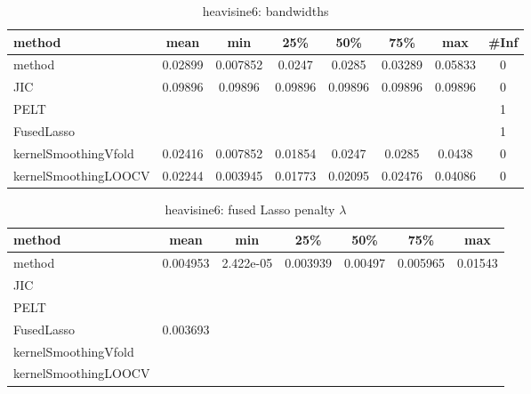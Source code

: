 \begin{table}[ht]
\centering
\begin{tabular}{l|c|ccccc|c}
  \hline
method & mean & min & 25\% & 50\% & 75\% & max & \#Inf \\ 
  \hline
method & 0.02899 & 0.007852 & 0.0247 & 0.0285 & 0.03289 & 0.05833 &   0 \\ 
  JIC & 0.09896 & 0.09896 & 0.09896 & 0.09896 & 0.09896 & 0.09896 &   0 \\ 
  PELT &  &  &  &  &  &  &   1 \\ 
  FusedLasso &  &  &  &  &  &  &   1 \\ 
  kernelSmoothingVfold & 0.02416 & 0.007852 & 0.01854 & 0.0247 & 0.0285 & 0.0438 &   0 \\ 
  kernelSmoothingLOOCV & 0.02244 & 0.003945 & 0.01773 & 0.02095 & 0.02476 & 0.04086 &   0 \\ 
   \hline
\end{tabular}
\caption{heavisine6: bandwidths} 
\label{tab:heavisine6Bandwidths}
\end{table}
\begin{table}[ht]
\centering
\begin{tabular}{l|c|ccccc}
  \hline
method & mean & min & 25\% & 50\% & 75\% & max \\ 
  \hline
method & 0.004953 & 2.422e-05 & 0.003939 & 0.00497 & 0.005965 & 0.01543 \\ 
  JIC &  &  &  &  &  &  \\ 
  PELT &  &  &  &  &  &  \\ 
  FusedLasso & 0.003693 &  &  &  &  &  \\ 
  kernelSmoothingVfold &  &  &  &  &  &  \\ 
  kernelSmoothingLOOCV &  &  &  &  &  &  \\ 
   \hline
\end{tabular}
\caption{heavisine6: fused Lasso penalty $\lambda$} 
\label{tab:heavisine6Lambdas}
\end{table}
